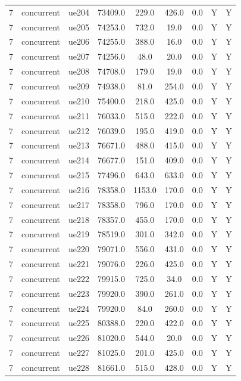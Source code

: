 \begin{table}[ht]
\begin{tabular}{|c|c|c|c|c|c|c|c|c|}
7 & concurrent & ue204 & 73409.0 & 229.0 & 426.0 & 0.0 & Y & Y \\
7 & concurrent & ue205 & 74253.0 & 732.0 & 19.0 & 0.0 & Y & Y \\
7 & concurrent & ue206 & 74255.0 & 388.0 & 16.0 & 0.0 & Y & Y \\
7 & concurrent & ue207 & 74256.0 & 48.0 & 20.0 & 0.0 & Y & Y \\
7 & concurrent & ue208 & 74708.0 & 179.0 & 19.0 & 0.0 & Y & Y \\
7 & concurrent & ue209 & 74938.0 & 81.0 & 254.0 & 0.0 & Y & Y \\
7 & concurrent & ue210 & 75400.0 & 218.0 & 425.0 & 0.0 & Y & Y \\
7 & concurrent & ue211 & 76033.0 & 515.0 & 222.0 & 0.0 & Y & Y \\
7 & concurrent & ue212 & 76039.0 & 195.0 & 419.0 & 0.0 & Y & Y \\
7 & concurrent & ue213 & 76671.0 & 488.0 & 415.0 & 0.0 & Y & Y \\
7 & concurrent & ue214 & 76677.0 & 151.0 & 409.0 & 0.0 & Y & Y \\
7 & concurrent & ue215 & 77496.0 & 643.0 & 633.0 & 0.0 & Y & Y \\
7 & concurrent & ue216 & 78358.0 & 1153.0 & 170.0 & 0.0 & Y & Y \\
7 & concurrent & ue217 & 78358.0 & 796.0 & 170.0 & 0.0 & Y & Y \\
7 & concurrent & ue218 & 78357.0 & 455.0 & 170.0 & 0.0 & Y & Y \\
7 & concurrent & ue219 & 78519.0 & 301.0 & 342.0 & 0.0 & Y & Y \\
7 & concurrent & ue220 & 79071.0 & 556.0 & 431.0 & 0.0 & Y & Y \\
7 & concurrent & ue221 & 79076.0 & 226.0 & 425.0 & 0.0 & Y & Y \\
7 & concurrent & ue222 & 79915.0 & 725.0 & 34.0 & 0.0 & Y & Y \\
7 & concurrent & ue223 & 79920.0 & 390.0 & 261.0 & 0.0 & Y & Y \\
7 & concurrent & ue224 & 79920.0 & 84.0 & 260.0 & 0.0 & Y & Y \\
7 & concurrent & ue225 & 80388.0 & 220.0 & 422.0 & 0.0 & Y & Y \\
7 & concurrent & ue226 & 81020.0 & 544.0 & 20.0 & 0.0 & Y & Y \\
7 & concurrent & ue227 & 81025.0 & 201.0 & 425.0 & 0.0 & Y & Y \\
7 & concurrent & ue228 & 81661.0 & 515.0 & 428.0 & 0.0 & Y & Y \\

\end{tabular}
\end{table}
